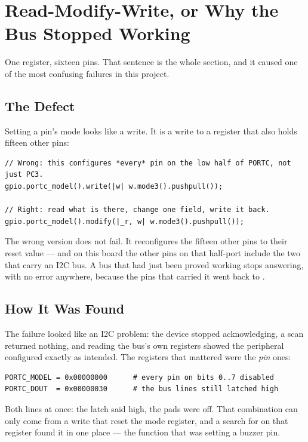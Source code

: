 \section{Read-Modify-Write, or Why the Bus Stopped Working}
\label{sec:gpio-rmw}

One register, sixteen pins. That sentence is the whole section, and it caused one of the most
confusing failures in this project.

\subsection{The Defect}

Setting a pin's mode looks like a write. It is a write to a register that also holds fifteen other
pins:

\begin{verbatim}
// Wrong: this configures *every* pin on the low half of PORTC, not just PC3.
gpio.portc_model().write(|w| w.mode3().pushpull());

// Right: read what is there, change one field, write it back.
gpio.portc_model().modify(|_r, w| w.mode3().pushpull());
\end{verbatim}

The wrong version does not fail. It reconfigures the fifteen other pins to their reset value — and on
this board the other pins on that half-port include the two that carry an I2C bus. A bus that had
just been proved working stops answering, with no error anywhere, because the pins that carried it
went back to .

\subsection{How It Was Found}

The failure looked like an I2C problem: the device stopped acknowledging, a scan returned nothing,
and reading the bus's own registers showed the peripheral configured exactly as intended. The
registers that mattered were the \emph{pin} ones:

\begin{verbatim}
PORTC_MODEL = 0x00000000      # every pin on bits 0..7 disabled
PORTC_DOUT  = 0x00000030      # the bus lines still latched high
\end{verbatim}

Both lines at once: the latch said high, the pads were off. That combination can only come from a
write that reset the mode register, and a search for  on that register found it
in one place — the function that was setting a buzzer pin.

